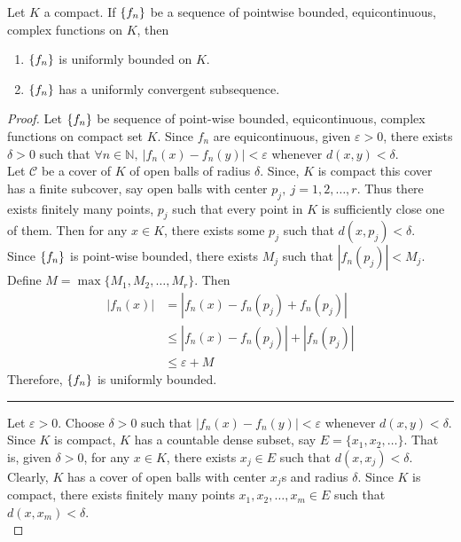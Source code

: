\begin{theorem}
	Let $K$ a compact.
	If $\left\{f_n\right\}$ be a sequence of pointwise bounded, equicontinuous, complex functions on $K$, then
	\begin{enumerate}
		\item $\left\{f_n\right\}$ is uniformly bounded on $K$.
		\item $\left\{f_n\right\}$ has a uniformly convergent subsequence.
	\end{enumerate}
\end{theorem}
\begin{proof}
	Let $\left\{f_n\right\}$ be sequence of point-wise bounded, equicontinuous, complex functions on compact set $K$.
	Since $f_n$ are equicontinuous, given $\varepsilon > 0$, there exists $\delta > 0$ such that $\forall n \in \mathbb{N},\ |f_n(x)-f_n(y)| < \varepsilon$ whenever $d(x,y) < \delta$.\\

	Let $\mathcal{C}$ be a cover of $K$ of open balls of radius $\delta$.
	Since, $K$ is compact this cover has a finite subcover, say open balls with center $p_j,\ j = 1,2,\dots,r$.
	Thus there exists finitely many points, $p_j$ such that every point in $K$ is sufficiently close one of them.
	Then for any $x \in K$, there exists some $p_j$ such that $d(x,p_j) < \delta$.\\

	Since $\left\{f_n\right\}$ is point-wise bounded, there exists $M_j$ such that $|f_n(p_j)| < M_j$.
	Define $M = \max \{ M_1, M_2, \dots, M_r\}$. 
	Then 
	\begin{align*}
		|f_n(x)| & = |f_n(x)-f_n(p_j)+f_n(p_j)| \\
		& \le |f_n(x) - f_n(p_j)| + |f_n(p_j)| \\
		& \le \varepsilon + M
	\end{align*}
	Therefore, $\left\{f_n\right\}$ is uniformly bounded.\\

	\hrule \vspace{1em}

	Let $\varepsilon > 0$.
	Choose $\delta > 0$ such that $|f_n(x)-f_n(y)| < \varepsilon$ whenever $d(x,y) < \delta$.
	Since $K$ is compact, $K$ has a countable dense subset, say $E = \{x_1,x_2,\dotsc\}$.
	That is, given $\delta > 0$, for any $x \in K$, there exists $x_j \in E$ such that $d(x,x_j) < \delta$.
	Clearly, $K$ has a cover of open balls with center $x_j$s and radius $\delta$.
	Since $K$ is compact, there exists finitely many points $x_1,x_2,\dots,x_m \in E$ such that $d(x,x_m) < \delta$.\\


\end{proof}
